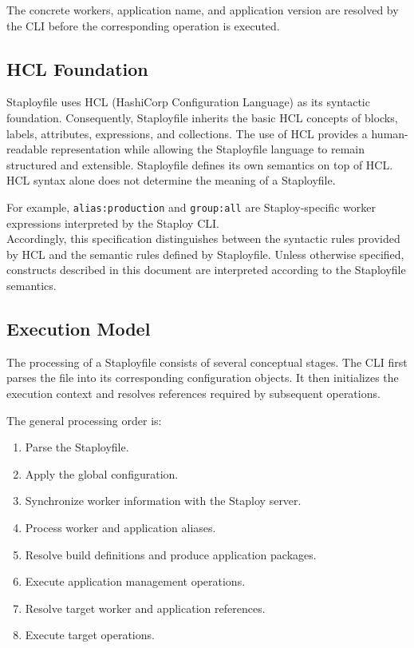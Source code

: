 \documentclass[11pt,a4paper]{article}
\begin{document}
    The concrete workers, application name, and application version are
    resolved by the CLI before the corresponding operation is executed.

    \subsection{HCL Foundation}\label{subsec:hcl-foundation}

    Staployfile uses HCL (HashiCorp Configuration Language) as its syntactic foundation.
    Consequently, Staployfile inherits the basic HCL
    concepts of blocks, labels, attributes, expressions, and collections.
    The use of HCL provides a human-readable representation while allowing
    the Staployfile language to remain structured and extensible.
    Staployfile defines its own semantics on top of HCL. HCL syntax alone
    does not determine the meaning of a Staployfile.

    For example,
    \texttt{alias:production} and \texttt{group:all} are Staploy-specific
    worker expressions interpreted by the Staploy CLI. \\
    Accordingly, this specification distinguishes between the syntactic
    rules provided by HCL and the semantic rules defined by Staployfile.
    Unless otherwise specified, constructs described in this document are
    interpreted according to the Staployfile semantics.

    \subsection{Execution Model}\label{subsec:execution-model}

    The processing of a Staployfile consists of several conceptual stages.
    The CLI first parses the file into its corresponding configuration objects.
    It then initializes the execution context and resolves references required by subsequent operations.

    The general processing order is:

    \begin{enumerate}
        \item Parse the Staployfile.
        \item Apply the global configuration.
        \item Synchronize worker information with the Staploy server.
        \item Process worker and application aliases.
        \item Resolve build definitions and produce application packages.
        \item Execute application management operations.
        \item Resolve target worker and application references.
        \item Execute target operations.
    \end{enumerate}
\end{document}
